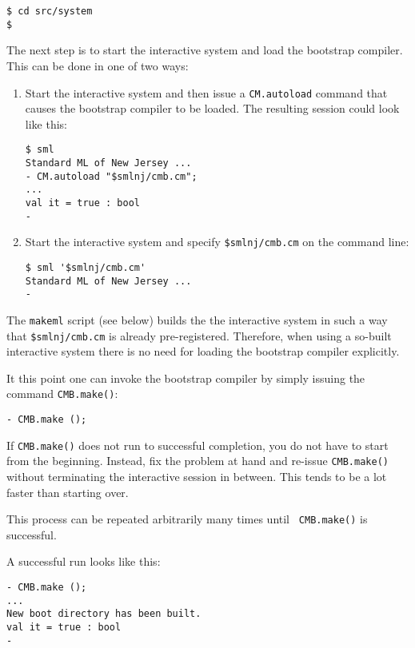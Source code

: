 \begin{verbatim}
$ cd src/system
$
\end{verbatim}

The next step is to start the interactive system and load the
bootstrap compiler.  This can be done in one of two ways:

\begin{enumerate}
\item Start the interactive system and then issue a {\tt CM.autoload}
command that causes the bootstrap compiler to be loaded. The resulting
session could look like this:
\begin{verbatim}
$ sml
Standard ML of New Jersey ...
- CM.autoload "$smlnj/cmb.cm";
...
val it = true : bool
-
\end{verbatim}
\item Start the interactive system and specify {\tt \$smlnj/cmb.cm} on
the command line:
\begin{verbatim}
$ sml '$smlnj/cmb.cm'
Standard ML of New Jersey ...
-  
\end{verbatim}
\end{enumerate}

 The {\tt makeml}
script (see below) builds the the interactive system in such a way
that {\tt \$smlnj/cmb.cm} is already pre-registered.  Therefore, when
using a so-built interactive system there is no need for loading the
bootstrap compiler explicitly.

It this point one can invoke the bootstrap compiler by simply issuing
the command {\tt CMB.make()}:

\begin{verbatim}
- CMB.make ();
\end{verbatim}

If {\tt CMB.make()} does not run to successful completion, you do not
have to start from the beginning.  Instead, fix the problem at hand
and re-issue {\tt CMB.make()} without terminating the interactive
session in between.  This tends to be a lot faster than starting over.

This process can be repeated arbitrarily many times until {\tt
CMB.make()} is successful.

A successful run looks like this:

\begin{verbatim}
- CMB.make ();
...
New boot directory has been built.
val it = true : bool
- 
\end{verbatim}

